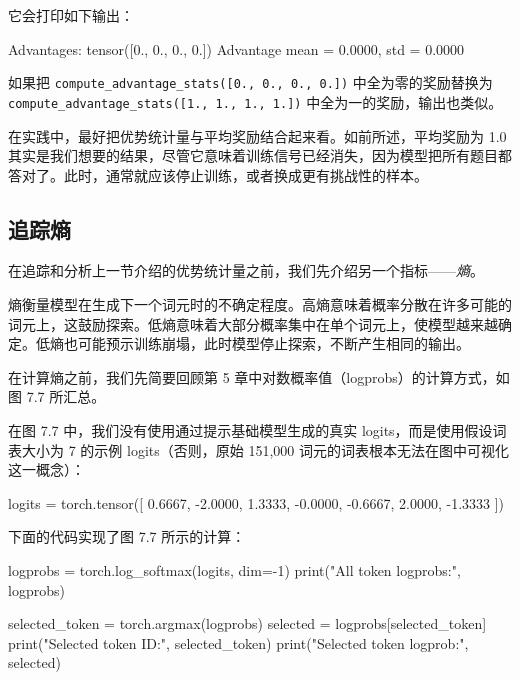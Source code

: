 它会打印如下输出：

\begin{codebox}
Advantages: tensor([0., 0., 0., 0.])
Advantage mean = 0.0000, std = 0.0000
\end{codebox}

如果把 \texttt{compute\_advantage\_stats([0., 0., 0., 0.])} 中全为零的奖励替换为 \texttt{compute\_advantage\_stats([1., 1., 1., 1.])} 中全为一的奖励，输出也类似。

在实践中，最好把优势统计量与平均奖励结合起来看。如前所述，平均奖励为 1.0 其实是我们想要的结果，尽管它意味着训练信号已经消失，因为模型把所有题目都答对了。此时，通常就应该停止训练，或者换成更有挑战性的样本。

\subsection{追踪熵}

在追踪和分析上一节介绍的优势统计量之前，我们先介绍另一个指标——\emph{熵}。

熵衡量模型在生成下一个词元时的不确定程度。高熵意味着概率分散在许多可能的词元上，这鼓励探索。低熵意味着大部分概率集中在单个词元上，使模型越来越确定。低熵也可能预示训练崩塌，此时模型停止探索，不断产生相同的输出。

在计算熵之前，我们先简要回顾第 5 章中对数概率值（logprobs）的计算方式，如图 7.7 所汇总。


在图 7.7 中，我们没有使用通过提示基础模型生成的真实 logits，而是使用假设词表大小为 7 的示例 logits（否则，原始 151,000 词元的词表根本无法在图中可视化这一概念）：

\begin{codebox}
logits = torch.tensor([
    0.6667, -2.0000,  1.3333, -0.0000, -0.6667,  2.0000, -1.3333
])
\end{codebox}

下面的代码实现了图 7.7 所示的计算：

\begin{codebox}
logprobs = torch.log_softmax(logits, dim=-1)
print("All token logprobs:", logprobs)

selected_token = torch.argmax(logprobs)
selected = logprobs[selected_token]
print("Selected token ID:", selected_token)
print("Selected token logprob:", selected)
\end{codebox}

